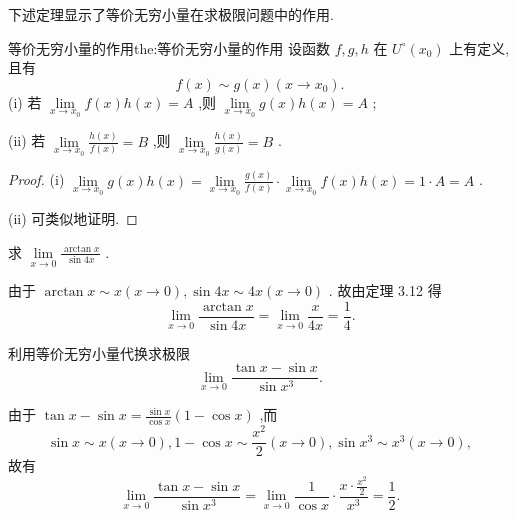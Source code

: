 下述定理显示了等价无穷小量在求极限问题中的作用.

\begin{theorem}{等价无穷小量的作用}{the:等价无穷小量的作用}
设函数 \(f,g,h\) 在 \({U}^{ \circ  }\left( {x}_{0}\right)\) 上有定义,且有
\[
f\left( x\right)  \sim  g\left( x\right) \left( {x \rightarrow  {x}_{0}}\right) .
\]
(i) 若 \(\mathop{\lim }\limits_{{x \rightarrow  {x}_{0}}}f\left( x\right) h\left( x\right)  = A\) ,则 \(\mathop{\lim }\limits_{{x \rightarrow  {x}_{0}}}g\left( x\right) h\left( x\right)  = A\) ;

(ii) 若 \(\mathop{\lim }\limits_{{x \rightarrow  {x}_{0}}}\frac{h\left( x\right) }{f\left( x\right) } = B\) ,则 \(\mathop{\lim }\limits_{{x \rightarrow  {x}_{0}}}\frac{h\left( x\right) }{g\left( x\right) } = B\) .
\end{theorem}

\begin{proof}
(i) \(\mathop{\lim }\limits_{{x \rightarrow  {x}_{0}}}g\left( x\right) h\left( x\right)  = \mathop{\lim }\limits_{{x \rightarrow  {x}_{0}}}\frac{g\left( x\right) }{f\left( x\right) } \cdot  \mathop{\lim }\limits_{{x \rightarrow  {x}_{0}}}f\left( x\right) h\left( x\right)  = 1 \cdot  A = A\) .

(ii) 可类似地证明.
\end{proof}


\begin{example}
求 \(\mathop{\lim }\limits_{{x \rightarrow  0}}\frac{\arctan x}{\sin {4x}}\) .
\end{example}


\begin{solution}
由于 \(\arctan x \sim  x\left( {x \rightarrow  0}\right) ,\sin {4x} \sim  {4x}\left( {x \rightarrow  0}\right)\) . 故由定理 3.12 得
\[
\mathop{\lim }\limits_{{x \rightarrow  0}}\frac{\arctan x}{\sin {4x}} = \mathop{\lim }\limits_{{x \rightarrow  0}}\frac{x}{4x} = \frac{1}{4}.
\]
\end{solution}

\begin{example}

\end{example}
利用等价无穷小量代换求极限
\[
\mathop{\lim }\limits_{{x \rightarrow  0}}\frac{\tan x - \sin x}{\sin {x}^{3}}.
\]
\begin{solution}
由于 \(\tan x - \sin x = \frac{\sin x}{\cos x}\left( {1 - \cos x}\right)\) ,而
\[
\sin x \sim  x\left( {x \rightarrow  0}\right) ,1 - \cos x \sim  \frac{{x}^{2}}{2}\left( {x \rightarrow  0}\right) ,\sin {x}^{3} \sim  {x}^{3}\left( {x \rightarrow  0}\right) ,
\]
故有
\[
\mathop{\lim }\limits_{{x \rightarrow  0}}\frac{\tan x - \sin x}{\sin {x}^{3}} = \mathop{\lim }\limits_{{x \rightarrow  0}}\frac{1}{\cos x} \cdot  \frac{x \cdot  \frac{{x}^{2}}{2}}{{x}^{3}} = \frac{1}{2}.
\]
\end{solution}

